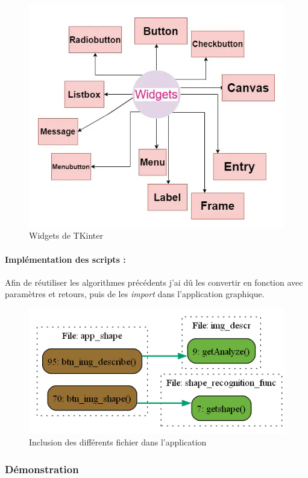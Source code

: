 \begin{figure}[h]
	\centering
	\includegraphics[width=0.5\linewidth]{Figures/TKinter_widgets}
	\caption{Widgets de TKinter}
	\label{fig:tkinterwidgets}
\end{figure}


\paragraph{Implémentation des scripts :} Afin de réutiliser les algorithmes précédents j'ai dû les convertir en fonction avec paramètres et retours, puis de les \textit{import} dans l'application graphique.

\begin{figure}[h]
	\centering
	\includegraphics[width=0.56\linewidth]{Figures/flowchart-fichiers}
	\caption{Inclusion des différents fichier dans l'application}
	\label{fig:flowchart-fichiers}
\end{figure}


\clearpage
\subsubsection{Démonstration}

